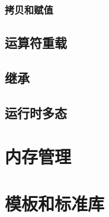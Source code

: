 \documentclass[hyperref,UTF8]{article}
\begin{document}
\subsubsection{拷贝和赋值}

\subsection{运算符重载}

\subsection{继承}

\subsection{运行时多态}

\section{内存管理}

\section{模板和标准库}


\end{document}
